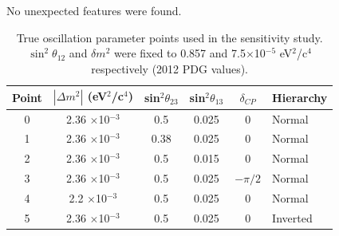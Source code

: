  No unexpected features were found.

%
%

\begin{table}[htb]
\centering
\begin{tabular}{| c | c  c  c  c  l| }
\hline
Point &  $|\Delta m^2|$ (eV$^{2}$/c$^{4}$) & sin$^2\theta_{23}$ & sin$^2\theta_{13}$  & $\delta_{CP}$  & Hierarchy  \\
\hline
0     &  2.36 $\times$10$^{-3}$            & 0.5              & 0.025               & 0          & Normal     \\
1     &  2.36 $\times$10$^{-3}$            & 0.38            & 0.025               & 0          & Normal  \\
  2    &   2.36 $\times$10$^{-3}$          & 0.5              & 0.015                & 0          & Normal          \\
 3     & 2.36 $\times$10$^{-3}$            & 0.5              & 0.025                & $-\pi/2$         & Normal         \\
  4    &   2.2 $\times$10$^{-3}$            & 0.5               & 0.025                & 0               &   Normal        \\
  5     &  2.36 $\times$10$^{-3}$            & 0.5              & 0.025               & 0          & Inverted     \\
\hline
\end{tabular}
\caption{
  True oscillation parameter points used in the sensitivity study.
  $\sin^{2}\theta_{12}$ and $\delta m^{2}$ were fixed to 0.857 and 7.5$\times$10$^{-5}$ eV$^{2}$/c$^{4}$ respectively (2012 PDG values).
}
\label{tab:sensitivity:true_points}
\end{table}



%
%

